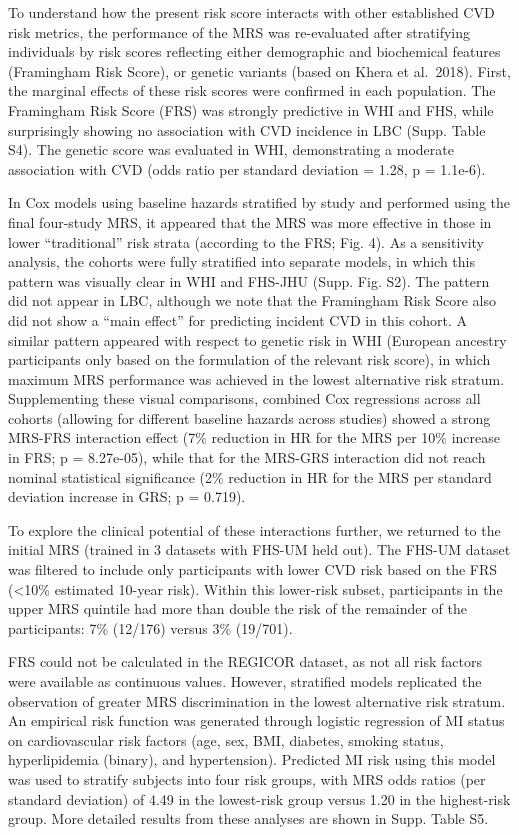 \documentclass[]{article}
\begin{document}
To understand how the present risk score interacts with other
established CVD risk metrics, the performance of the MRS was
re-evaluated after stratifying individuals by risk scores reflecting
either demographic and biochemical features (Framingham Risk Score), or
genetic variants (based on Khera et al.~2018). First, the marginal
effects of these risk scores were confirmed in each population. The
Framingham Risk Score (FRS) was strongly predictive in WHI and FHS,
while surprisingly showing no association with CVD incidence in LBC
(Supp. Table S4). The genetic score was evaluated in WHI, demonstrating
a moderate association with CVD (odds ratio per standard deviation =
1.28, p = 1.1e-6).

In Cox models using baseline hazards stratified by study and performed
using the final four-study MRS, it appeared that the MRS was more
effective in those in lower ``traditional'' risk strata (according to
the FRS; Fig. 4). As a sensitivity analysis, the cohorts were fully
stratified into separate models, in which this pattern was visually
clear in WHI and FHS-JHU (Supp. Fig. S2). The pattern did not appear in
LBC, although we note that the Framingham Risk Score also did not show a
``main effect'' for predicting incident CVD in this cohort. A similar
pattern appeared with respect to genetic risk in WHI (European ancestry
participants only based on the formulation of the relevant risk score),
in which maximum MRS performance was achieved in the lowest alternative
risk stratum. Supplementing these visual comparisons, combined Cox
regressions across all cohorts (allowing for different baseline hazards
across studies) showed a strong MRS-FRS interaction effect (7\%
reduction in HR for the MRS per 10\% increase in FRS; p = 8.27e-05),
while that for the MRS-GRS interaction did not reach nominal statistical
significance (2\% reduction in HR for the MRS per standard deviation
increase in GRS; p = 0.719).

To explore the clinical potential of these interactions further, we
returned to the initial MRS (trained in 3 datasets with FHS-UM held
out). The FHS-UM dataset was filtered to include only participants with
lower CVD risk based on the FRS (\textless{}10\% estimated 10-year
risk). Within this lower-risk subset, participants in the upper MRS
quintile had more than double the risk of the remainder of the
participants: 7\% (12/176) versus 3\% (19/701).

FRS could not be calculated in the REGICOR dataset, as not all risk
factors were available as continuous values. However, stratified models
replicated the observation of greater MRS discrimination in the lowest
alternative risk stratum. An empirical risk function was generated
through logistic regression of MI status on cardiovascular risk factors
(age, sex, BMI, diabetes, smoking status, hyperlipidemia (binary), and
hypertension). Predicted MI risk using this model was used to stratify
subjects into four risk groups, with MRS odds ratios (per standard
deviation) of 4.49 in the lowest-risk group versus 1.20 in the
highest-risk group. More detailed results from these analyses are shown
in Supp. Table S5.
\end{document}
